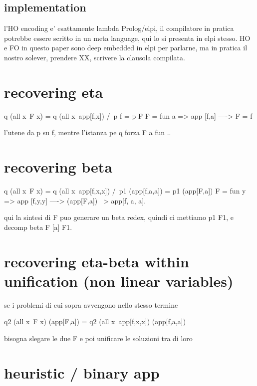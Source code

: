 \documentclass[sigconf,natbib=false]{acmart}
\begin{document}
\noindent


\subsection{implementation}

l'HO encoding e' esattamente lambda Prolog/elpi, il compilatore
in pratica potrebbe essere scritto in un meta language, qui lo si presenta in
elpi stesso. HO e FO in questo paper sono deep embedded in elpi per parlarne,
ma in pratica il nostro solever, prendere XX, scrivere la clausola compilata.


\section{recovering eta}

\begin{elpicode}
q (all x\ F x) = q (all x\ app[f,x]) /\ p f = p F
F = fun a => app [f,a] ----> F = f
\end{elpicode}

l'utene da p su f, mentre l'istanza pe q forza F a fun .. 

\section{recovering beta}

\begin{elpicode}
  q (all x\ F x) = q (all x\ app[f,x,x]) /\ p1 (app[f,a,a]) = p1 (app[F,a])
  F = fun y => app [f,y,y] ----> (app[F,a]) ~> app[f, a, a].
\end{elpicode}
  
qui la sintesi di F puo generare un beta redex, quindi ci mettiamo
p1 F1, e decomp beta F [a] F1.

\section{recovering eta-beta within unification (non linear variables)}

se i problemi di cui sopra avvengono nello stesso termine

\begin{elpicode}
  q2 (all x\ F x) (app[F,a]) = q2 (all x\ app[f,x,x]) (app[f,a,a])
\end{elpicode}

bisogna slegare le due F e poi unificare le soluzioni tra di loro

\section{heuristic / binary app}
\end{document}
